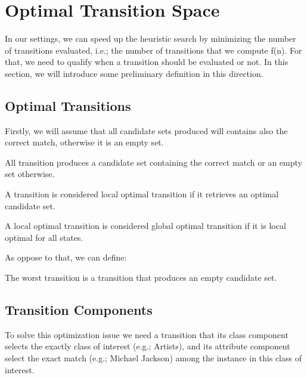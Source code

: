 \section{Optimal Transition Space}

In our settings, we can speed up the heuristic search by minimizing the number of transitions evaluated, i.e.; the number of transitions that we compute f(n). For that, we need to qualify when a transition should be evaluated or not. In this section, we will introduce some preliminary definition in this direction.

\subsection{Optimal Transitions}

Firstly, we will assume that all candidate sets produced will contains also the correct match, otherwise it is an empty set.

\begin{definition} All transition produces a candidate set containing the correct match or an empty set otherwise.
\end{definition}  

\begin{definition} A transition is considered local optimal transition if it retrieves an optimal candidate set.
\end{definition}  

\begin{definition} A local optimal transition is considered global optimal transition if it is local optimal for all states. 
\end{definition}  

As oppose to that, we can define:

\begin{definition} The worst transition is a transition that produces an empty candidate set.
\end{definition}   
 
\subsection{Transition Components}

To solve this optimization issue we need a transition that its class component selects the exactly class of interest (e.g.; Artists), and its attribute component select the exact match (e.g.; Michael Jackson) among the instance in this class of interest.

